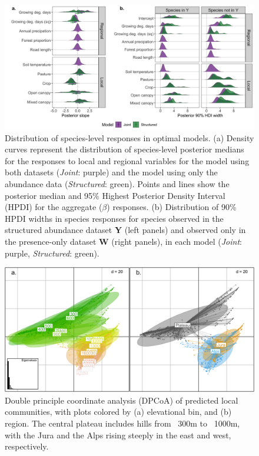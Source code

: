 \documentclass[preprint,review,times,12pt]{elsarticle}
\begin{document}
\begin{figure}
\centering\includegraphics[width=6in]{ms/1_Ecography/1/figs/slope_means+HDI.png}
\caption{\label{fig:slope_means} Distribution of species-level responses in optimal models. (a) Density curves represent the distribution of species-level posterior medians for the responses to local and regional variables for the model using both datasets (\emph{Joint}: purple) and the model using only the abundance data (\emph{Structured}: green). Points and lines show the posterior median and 95\% Highest Posterior Density Interval (HPDI) for the aggregate ($\beta$) responses. (b) Distribution of 90\% HPDI widths in species responses for species observed in the structured abundance dataset \textbf{Y} (left panels) and observed only in the presence-only dataset \textbf{W} (right panels), in each model (\emph{Joint}: purple, \emph{Structured}: green). }
\end{figure}

\begin{figure}
	\centering\includegraphics[width=5in]{ms/1_Ecography/1/figs/DPCoA.png}
	\caption{\label{fig:dpcoa} Double principle coordinate analysis (DPCoA) of predicted local communities, with plots colored by (a) elevational bin, and (b) region. The central plateau includes hills from ~300m to ~1000m, with the Jura and the Alps rising steeply in the east and west, respectively. }
\end{figure}
\end{document}
